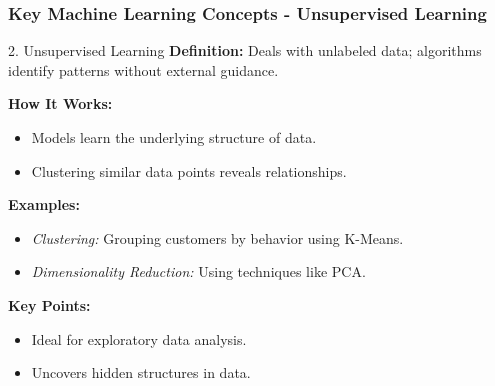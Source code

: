 \documentclass[aspectratio=169]{beamer}
\begin{document}
\begin{frame}[fragile]
    \frametitle{Key Machine Learning Concepts - Unsupervised Learning}
    \begin{block}{2. Unsupervised Learning}
        \textbf{Definition:} Deals with unlabeled data; algorithms identify patterns without external guidance.

        \textbf{How It Works:}
        \begin{itemize}
            \item Models learn the underlying structure of data.
            \item Clustering similar data points reveals relationships.
        \end{itemize}

        \textbf{Examples:}
        \begin{itemize}
            \item \textit{Clustering:} Grouping customers by behavior using K-Means.
            \item \textit{Dimensionality Reduction:} Using techniques like PCA.
        \end{itemize}

        \textbf{Key Points:}
        \begin{itemize}
            \item Ideal for exploratory data analysis.
            \item Uncovers hidden structures in data.
        \end{itemize}
    \end{block}
\end{frame}
\end{document}

